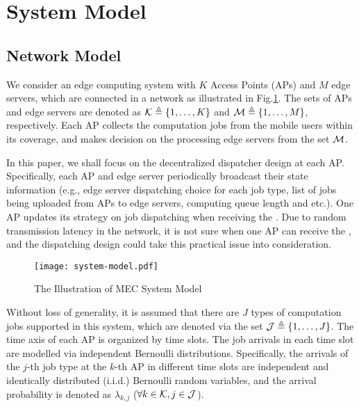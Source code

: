\section{System Model}
\subsection{Network Model}
We consider an edge computing system with $K$ Access Points (APs) and $M$ edge servers, which are connected in a network as illustrated in Fig.\ref{fig:system}.
The sets of APs and edge servers are denoted as $\mathcal{K} \triangleq \{1,\dots,K\}$ and $\mathcal{M} \triangleq \{1,\dots,M\}$, respectively.
Each AP collects the computation jobs from the mobile users within its coverage, and makes decision on the processing edge servers from the set $\mathcal{M}$.

In this paper, we shall focus on the decentralized dispatcher design at each AP.
Specifically, each AP and edge server periodically broadcast their state information (e.g., edge server dispatching choice for each job type, list of jobs being uploaded from APs to edge servers, computing queue length and etc.).
One AP updates its strategy on job dispatching when receiving the .
Due to random transmission latency in the network, it is not sure when one AP can receive the , and the dispatching design could take this practical issue into consideration.

\begin{figure}[ht]
    \centering
    \texttt{[image: system-model.pdf]}
    \caption{The Illustration of MEC System Model}
    \label{fig:system}
\end{figure}

Without loss of generality, it is assumed that there are $J$ types of computation jobs supported in this system, which are denoted via the set $\mathcal{J} \triangleq \{1,\dots,J\}$.
The time axis of each AP is organized by time slots.
The job arrivals in each time slot are modelled via independent Bernoulli distributions.
Specifically, the arrivals of the $j$-th job type at the $k$-th AP in different time slots are independent and identically distributed (i.i.d.) Bernoulli random variables, and the arrival probability is denoted as $\lambda_{k,j}$ ($\forall k\in\mathcal{K}, j\in\mathcal{J}$).

